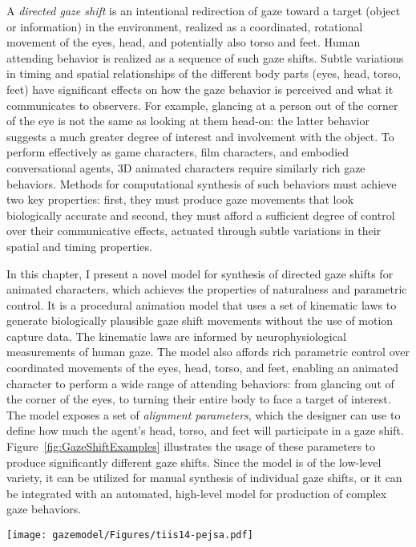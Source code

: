 A \emph{directed gaze shift} is an intentional redirection of gaze toward a target (object or information) in the environment, realized as a coordinated, rotational movement of the eyes, head, and potentially also torso and feet. Human attending behavior is realized as a sequence of such gaze shifts. Subtle variations in timing and spatial relationships of the different body parts (eyes, head, torso, feet) have significant effects on how the gaze behavior is perceived and what it communicates to observers. For example, glancing at a person out of the corner of the eye is not the same as looking at them head-on: the latter behavior suggests a much greater degree of interest and involvement with the object. To perform effectively as game characters, film characters, and embodied conversational agents, 3D animated characters require similarly rich gaze behaviors. Methods for computational synthesis of such behaviors must achieve two key properties: first, they must produce gaze movements that look biologically accurate and second, they must afford a sufficient degree of control over their communicative effects, actuated through subtle variations in their spatial and timing properties.

In this chapter, I present a novel model for synthesis of directed gaze shifts for animated characters, which achieves the properties of naturalness and parametric control. It is a procedural animation model that uses a set of kinematic laws to generate biologically plausible gaze shift movements without the use of motion capture data. The kinematic laws are informed by neurophysiological measurements of human gaze. The model also affords rich parametric control over coordinated movements of the eyes, head, torso, and feet, enabling an animated character to perform a wide range of attending behaviors: from glancing out of the corner of the eyes, to turning their entire body to face a target of interest. The model exposes a set of \emph{alignment parameters}, which the designer can use to define how much the agent's head, torso, and feet will participate in a gaze shift. Figure~\ref{fig:GazeShiftExamples} illustrates the usage of these parameters to produce significantly different gaze shifts. Since the model is of the low-level variety, it can be utilized for manual synthesis of individual gaze shifts, or it can be integrated with an automated, high-level model for production of complex gaze behaviors.

\begin{figure*}
\centering
\texttt{[image: gazemodel/Figures/tiis14-pejsa.pdf]}
\caption{Examples of gaze shifts synthesized using our model. All gaze shifts are toward the same target (the red sphere). (1) Initially the agent maintains eye contact with the observer. (2) Gaze shift to the side with low value of the head alignment parameter. (3) Gaze shift in the same direction, but with high head alignment value. (4) Gaze shift in the same direction with a high torso alignment value. (5) Gaze shift in the same direction with a high whole-body alignment value.}
\label{fig:GazeShiftExamples}
\end{figure*}

